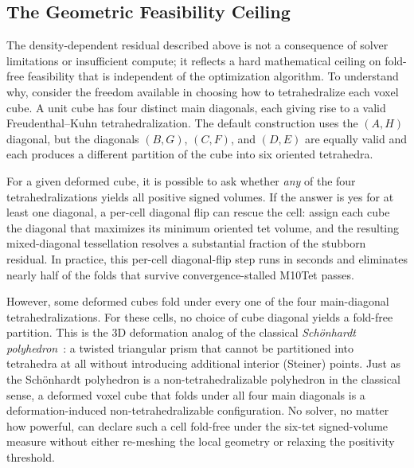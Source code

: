 \begin{table}[ht]\centering
\caption{TODO (deferred): Strict-feasibility and geometric ceiling results across fold-density regimes. Rows: sparse, moderate, and dense bands of the B0039 volume. Columns: initial fold count, post-Stage-1 fold count, post-Stage-2+3 fold count, minimum oriented tet volume, total wall time.}
\label{tab:strict_feas_3d}
\end{table}

\subsection{The Geometric Feasibility Ceiling}
\label{sec:geometric_ceiling}

The density-dependent residual described above is not a consequence of solver limitations or insufficient compute; it reflects a hard mathematical ceiling on fold-free feasibility that is independent of the optimization algorithm. To understand why, consider the freedom available in choosing how to tetrahedralize each voxel cube. A unit cube has four distinct main diagonals, each giving rise to a valid Freudenthal--Kuhn tetrahedralization. The default construction uses the $(A, H)$ diagonal, but the diagonals $(B, G)$, $(C, F)$, and $(D, E)$ are equally valid and each produces a different partition of the cube into six oriented tetrahedra.

For a given deformed cube, it is possible to ask whether \emph{any} of the four tetrahedralizations yields all positive signed volumes. If the answer is yes for at least one diagonal, a per-cell diagonal flip can rescue the cell: assign each cube the diagonal that maximizes its minimum oriented tet volume, and the resulting mixed-diagonal tessellation resolves a substantial fraction of the stubborn residual. In practice, this per-cell diagonal-flip step runs in seconds and eliminates nearly half of the folds that survive convergence-stalled M10Tet passes.

However, some deformed cubes fold under every one of the four main-diagonal tetrahedralizations. For these cells, no choice of cube diagonal yields a fold-free partition. This is the 3D deformation analog of the classical \emph{Sch\"onhardt polyhedron}~\cite{schonhardt1928}: a twisted triangular prism that cannot be partitioned into tetrahedra at all without introducing additional interior (Steiner) points. Just as the Sch\"onhardt polyhedron is a non-tetrahedralizable polyhedron in the classical sense, a deformed voxel cube that folds under all four main diagonals is a deformation-induced non-tetrahedralizable configuration. No solver, no matter how powerful, can declare such a cell fold-free under the six-tet signed-volume measure without either re-meshing the local geometry or relaxing the positivity threshold.

